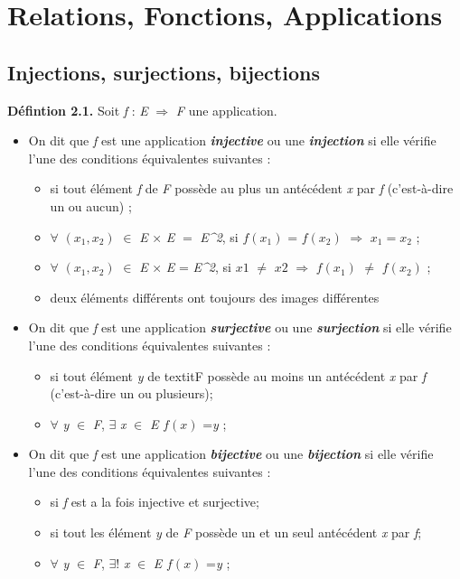 \documentclass{article}
\begin{document}
\section{Relations, Fonctions, Applications}
\subsection{Injections, surjections, bijections}
\textbf{Défintion 2.1.} Soit \textit{f} : \textit{E} $\Rightarrow$ \textit{F}  une application.
\begin{itemize}
    \item On dit que \textit{f} est une application \textbf{\textit{injective}} ou une \textbf{\textit{injection}} si elle vérifie l’une des conditions
équivalentes suivantes :
\begin{itemize}
    \item si tout élément \textit{f} de \textit{F} possède au plus un antécédent \textit{x} par \textit{f} (c’est-à-dire un ou aucun) ;
    \item $\forall$ $(x_{1}, x_{2})$  $\in$ \textit{E} × \textit{E} $=$
    \textit{E^2}, si $ f(x_{1})$ = $ f(x_{2}) $ $\Rightarrow$  $x_{1} = x_{2}$ ;
    \item $\forall$ $(x_{1}, x_{2})$  $\in$ \textit{E} × \textit{E} = \textit{E^2}, si $ x1 $ $\neq$ $x2 $ $\Rightarrow$  $ f(x_{1})$ $\neq$ $ f(x_{2})$ ;
    \item deux éléments différents ont toujours des images différentes
\end{itemize}
\item On dit que \textit{f} est une application \textbf{\textit{surjective}} ou une \textbf{\textit{surjection}} si elle vérifie l’une des conditions équivalentes suivantes :
\begin{itemize}
    \item si tout élément \textit{y} de textit{F} possède au moins un antécédent \textit{x} par \textit{f} (c'est-à-dire un ou plusieurs);
    \item $\forall$ \textit{y} $\in$ \textit{F}, $\exists$ \textit{x} $\in$ \textit{E} $ f(x)$ =\textit{y} ;
\end{itemize}
\item On dit que \textit{f} est une application \textbf{\textit{bijective}} ou une \textbf{\textit{bijection}} si elle vérifie l’une des conditions équivalentes suivantes :
\begin{itemize}
    \item si \textit{f} est a la fois injective et surjective;
    \item si tout les élément \textit{y} de \textit{F} possède un et un seul antécédent \textit{x} par \textit{f};
    \item $\forall$ \textit{y} $\in$ \textit{F}, $\exists$! \textit{x} $\in$ \textit{E} $ f(x)$ =\textit{y} ;
\end{itemize}
\end{itemize}
\end{document}

